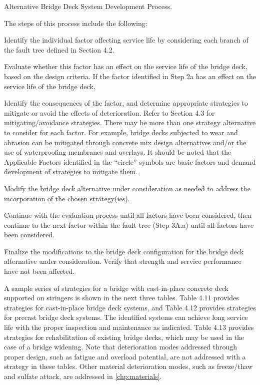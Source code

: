 \begin{table}
  \caption{Alternative Bridge Deck System Development Process.}
  \label{tab:alternative-deck-development}
\end{table}

The steps of this process include the following:
\begin{description}[style=nextline,leftmargin=8em]
  \item[Step 1A.] Identify the individual factor affecting service life by considering each branch of the fault tree defined in Section 4.2.
  \item[Step 2A.]Evaluate whether this factor has an effect on the service life of the bridge deck, based on the design
  criteria. If the factor identified in Step 2a has an effect on the service life of the bridge deck,
  \item[Step 2A.a.] Identify the consequences of the factor, and determine appropriate strategies to mitigate or avoid the effects of deterioration. Refer to Section 4.3 for mitigating/avoidance strategies. There may be more   than one strategy alternative to consider for each factor. For example, bridge decks subjected to wear and abrasion can be mitigated through concrete mix design alternatives and/or the use of waterproofing membranes and overlays. It should be noted that the Applicable Factors identified in
  the “circle” symbols are basic factors and demand development of strategies to mitigate them.
  \item[Step 2A.b.] Modify the bridge deck alternative under consideration as needed to address the incorporation of the chosen strategy(ies).
  \item[Step 3A:]Continue with the evaluation process until all factors have been considered, then continue to the next factor within the fault tree (Step 3A.a) until all factors have been considered.
  \item[Step 4A:] Finalize the modifications to the bridge deck configuration for the bridge deck alternative under consideration. Verify that strength and service performance have not been affected.
\end{description}

A sample series of strategies for a bridge with cast-in-place concrete deck supported on stringers is shown in the next three tables. Table 4.11 provides strategies for cast-in-place bridge deck systems, and Table 4.12 provides strategies for precast bridge deck systems. The identified systems can achieve long service life with the proper inspection and maintenance as indicated. Table 4.13 provides strategies for rehabilitation of existing bridge decks, which may be used in the case of a bridge widening. Note that deterioration modes addressed through proper design, such as fatigue and overload potential, are not addressed with a strategy in these tables. Other material deterioration modes, such as freeze/thaw and sulfate attack, are addressed in \cref{chp:materials}.

